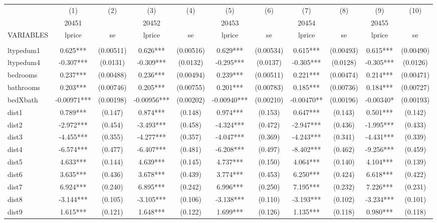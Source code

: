 \documentclass[]{article}
\begin{document}
\begin{tabular}{lcccccccccc} \hline
 & (1) & (2) & (3) & (4) & (5) & (6) & (7) & (8) & (9) & (10) \\
 & 20451 &  & 20452 &  & 20453 &  & 20454 &  & 20455 &  \\
VARIABLES & lprice & se & lprice & se & lprice & se & lprice & se & lprice & se \\ \hline
 &  &  &  &  &  &  &  &  &  &  \\
ltypedum1 & 0.625*** & (0.00511) & 0.626*** & (0.00516) & 0.629*** & (0.00534) & 0.615*** & (0.00493) & 0.615*** & (0.00490) \\
ltypedum4 & -0.307*** & (0.0131) & -0.309*** & (0.0132) & -0.295*** & (0.0137) & -0.305*** & (0.0128) & -0.305*** & (0.0126) \\
bedrooms & 0.237*** & (0.00488) & 0.236*** & (0.00494) & 0.239*** & (0.00511) & 0.221*** & (0.00474) & 0.214*** & (0.00471) \\
bathrooms & 0.203*** & (0.00746) & 0.205*** & (0.00755) & 0.201*** & (0.00783) & 0.185*** & (0.00736) & 0.184*** & (0.00727) \\
bedXbath & -0.00971*** & (0.00198) & -0.00956*** & (0.00202) & -0.00940*** & (0.00210) & -0.00470** & (0.00196) & -0.00340* & (0.00193) \\
dist1 & 0.789*** & (0.147) & 0.874*** & (0.148) & 0.974*** & (0.153) & 0.647*** & (0.143) & 0.501*** & (0.142) \\
dist2 & -2.972*** & (0.454) & -3.493*** & (0.458) & -4.324*** & (0.472) & -2.947*** & (0.436) & -1.995*** & (0.433) \\
dist3 & -4.455*** & (0.355) & -4.277*** & (0.357) & -4.047*** & (0.369) & -4.243*** & (0.341) & -4.431*** & (0.339) \\
dist4 & -6.574*** & (0.477) & -6.407*** & (0.481) & -6.208*** & (0.497) & -8.402*** & (0.462) & -9.256*** & (0.459) \\
dist5 & 4.633*** & (0.144) & 4.639*** & (0.145) & 4.737*** & (0.150) & 4.064*** & (0.140) & 4.104*** & (0.139) \\
dist6 & 3.635*** & (0.436) & 3.678*** & (0.439) & 3.774*** & (0.453) & 6.250*** & (0.424) & 6.618*** & (0.422) \\
dist7 & 6.924*** & (0.240) & 6.895*** & (0.242) & 6.996*** & (0.250) & 7.195*** & (0.232) & 7.226*** & (0.231) \\
dist8 & -3.144*** & (0.105) & -3.105*** & (0.106) & -3.138*** & (0.110) & -3.193*** & (0.102) & -3.234*** & (0.101) \\
dist9 & 1.615*** & (0.121) & 1.648*** & (0.122) & 1.699*** & (0.126) & 1.135*** & (0.118) & 0.980*** & (0.118) \\

\end{tabular}
\end{document}
